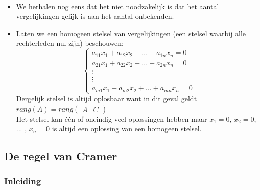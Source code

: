 \begin{opmerking}
	\ \\
	\begin{itemize}
	\item We herhalen nog eens dat het niet noodzakelijk is dat het aantal vergelijkingen gelijk is aan het aantal onbekenden.
	\item Laten we een homogeen stelsel van vergelijkingen (een stelsel waarbij alle rechterleden nul zijn) beschouwen:
	\[ 
	\left\{ \begin{array}{l}
	a_{11} x_1 + a_{12} x_2 + ... + a_{1n} x_n = 0 \\
	a_{21} x_1 + a_{22} x_2 + ... + a_{2n} x_n = 0 \\
	\vdots \\ \vdots \\
	a_{m1} x_1 + a_{m2} x_2 + ... + a_{mn} x_n = 0
	\end{array}
	\right.
	\]
	Dergelijk stelsel is altijd oplosbaar want in dit geval geldt $rang(A) = rang \left( \begin{array}{c|c} A & C \end{array} \right)$ \\
	Het stelsel kan \'{e}\'{e}n of oneindig veel oplossingen hebben maar $x_1 =0$, $x_2 =0$, $...$ , $x_n =0$ is altijd een oplossing van een homogeen stelsel.
\end{itemize}
\end{opmerking}

\subsection{De regel van Cramer}

\subsubsection{Inleiding}

